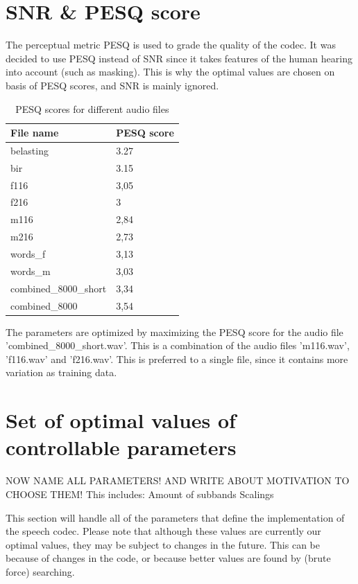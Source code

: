 \documentclass[a4paper]{article}
\begin{document}
\section{SNR \& PESQ score}
The perceptual metric PESQ is used to grade the quality of the codec. It was decided to use PESQ instead of SNR since it takes features of the human hearing into account (such as masking). This is why the optimal values are chosen on basis of PESQ scores, and SNR is mainly ignored.

\begin{table}[bth]
\begin{center}
\begin{tabular}{ |l|l| }
  \hline
  File name & PESQ score \\
  \hline
  belasting & 3.27 \\
  bir & 3.15 \\
  f116 & 3,05 \\
  f216 & 3 \\
  m116 & 2,84 \\
  m216 & 2,73 \\
  words\_f & 3,13 \\
  words\_m & 3,03 \\
  combined\_8000\_short & 3,34 \\
  combined\_8000 & 3,54 \\
  \hline
\end{tabular}
  \caption{PESQ scores for different audio files}
\label{fig:pesqscores}
\end{center}
\end{table}

The parameters are optimized by maximizing the PESQ score for the audio file 'combined\_8000\_short.wav'. This is a combination of the audio files 'm116.wav', 'f116.wav' and 'f216.wav'. This is preferred to a single file, since it contains more variation as training data.

\section{Set of optimal values of controllable parameters}
NOW NAME ALL PARAMETERS! AND WRITE ABOUT MOTIVATION TO CHOOSE THEM! This includes:
Amount of subbands
Scalings

This section will handle all of the parameters that define the implementation of the speech codec. Please note that although these values are currently our optimal values, they may be subject to changes in the future. This can be because of changes in the code, or because better values are found by (brute force) searching.
\end{document}
